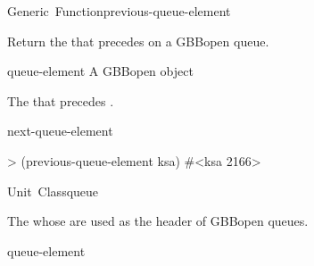 \documentclass[10pt,twoside,english,pdftex]{article}
\begin{document}

\begin{functiondoc}{Generic~Function}{previous-queue-element}%
  {
    \returns{} }
%

\fnsyntax

\fnpurpose Return the  that precedes
 on a GBBopen queue.

\fnmethods
{}%
  {\code{(} 
  \returns{} }

\fnpackage {}

\fnmodule {}

\fnargs
\begin{args}{queue-element}
 A GBBopen  object
\end{args}

\fnreturns The  that precedes
. 
  
\begin{alsos}{next-queue-element}
\end{alsos}

\fnexample
%
\W\supp
\begin{example}
> (previous-queue-element ksa)
#<ksa 2166>
\end{example}

\end{functiondoc}


\begin{functiondoc}{Unit~Class}{queue}{}
%
%
  
\fnsyntax

\fnpackage {}

\fnmodule {}

\fndescription The  whose  are used as
the header of GBBopen queues.

\begin{alsos}{queue-element}
\end{alsos}

\end{functiondoc}
\end{document}
